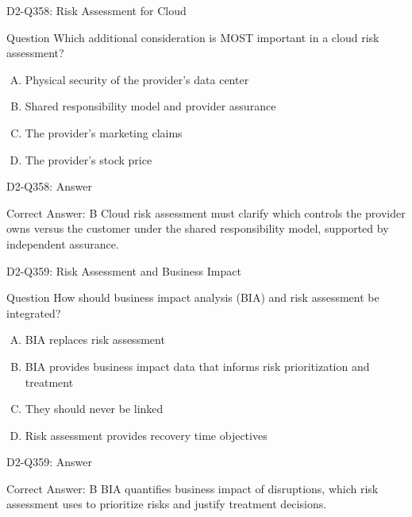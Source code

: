 \documentclass{beamer}
\begin{document}
\begin{frame}{D2-Q358: Risk Assessment for Cloud}
	\begin{block}{Question}
		Which additional consideration is MOST important in a cloud risk assessment?
	\end{block}
	\begin{enumerate}[(A)]
		\item Physical security of the provider's data center
		\item Shared responsibility model and provider assurance
		\item The provider's marketing claims
		\item The provider's stock price
	\end{enumerate}
\end{frame}
\begin{frame}{D2-Q358: Answer}
	\begin{block}{Correct Answer: B}
		Cloud risk assessment must clarify which controls the provider owns versus the customer under the shared responsibility model, supported by independent assurance.
	\end{block}
\end{frame}

\begin{frame}{D2-Q359: Risk Assessment and Business Impact}
	\begin{block}{Question}
		How should business impact analysis (BIA) and risk assessment be integrated?
	\end{block}
	\begin{enumerate}[(A)]
		\item BIA replaces risk assessment
		\item BIA provides business impact data that informs risk prioritization and treatment
		\item They should never be linked
		\item Risk assessment provides recovery time objectives
	\end{enumerate}
\end{frame}
\begin{frame}{D2-Q359: Answer}
	\begin{block}{Correct Answer: B}
		BIA quantifies business impact of disruptions, which risk assessment uses to prioritize risks and justify treatment decisions.
	\end{block}
\end{frame}
\end{document}
